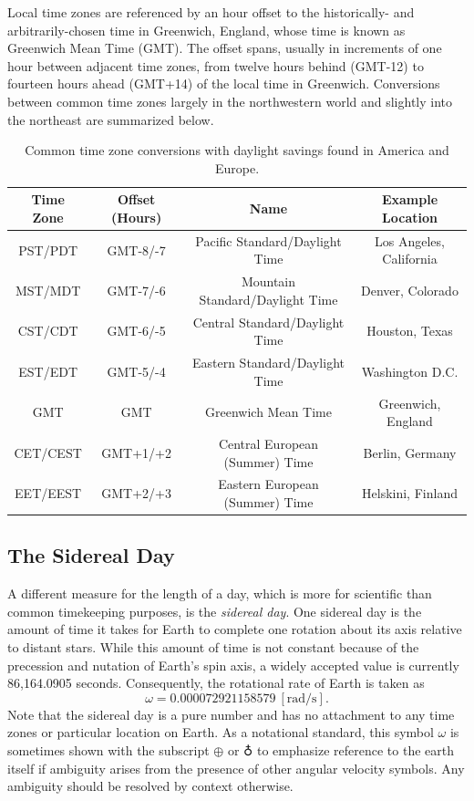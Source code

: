 \documentclass[11pt,dvipsnames]{thesis}
\begin{document}
Local time zones are referenced by an hour offset to the historically- and arbitrarily-chosen time in Greenwich, England, whose time is known as Greenwich Mean Time (GMT). The offset spans, usually in increments of one hour between adjacent time zones, from twelve hours behind (GMT-12) to fourteen hours ahead (GMT+14) of the local time in Greenwich. Conversions between common time zones largely in the northwestern world and slightly into the northeast are summarized below.
\begin{table}[H]
\centering
\caption{Common time zone conversions with daylight savings found in America and Europe.}
\label{tab:Timezones}
\begin{tabular}{SSSS}
\toprule
{Time Zone} & {Offset (Hours)} & {Name} & {Example Location} \\ \midrule
{PST/PDT} & {GMT-8/-7} & {Pacific Standard/Daylight Time} & {Los Angeles, California} \\
{MST/MDT} & {GMT-7/-6} & {Mountain Standard/Daylight Time} & {Denver, Colorado} \\
{CST/CDT} & {GMT-6/-5} & {Central Standard/Daylight Time} & {Houston, Texas} \\
{EST/EDT} & {GMT-5/-4} & {Eastern Standard/Daylight Time} & {Washington D.C.} \\
{GMT} & {GMT} & {Greenwich Mean Time} & {Greenwich, England} \\
{CET/CEST} & {GMT+1/+2} & {Central European (Summer) Time} & {Berlin, Germany} \\
{EET/EEST} & {GMT+2/+3} & {Eastern European (Summer) Time} & {Helskini, Finland} \\ \bottomrule
\end{tabular}
\end{table}

\subsection{The Sidereal Day}
A different measure for the length of a day, which is more for scientific than common timekeeping purposes, is the \textit{sidereal day}. One sidereal day is the amount of time it takes for Earth to complete one rotation about its axis relative to distant stars. While this amount of time is not constant because of the precession and nutation of Earth's spin axis, a widely accepted value is currently 86,164.0905 seconds. Consequently, the rotational rate of Earth is taken as
\begin{equation}
\omega = \num{0.000072921158579} \ [\si{\radian/\s}]. \label{eq:EarthRotRate}
\end{equation}
Note that the sidereal day is a pure number and has no attachment to any time zones or particular location on Earth. As a notational standard, this symbol $\omega$ is sometimes shown with the subscript $\oplus$ or $\earth$ to emphasize reference to the earth itself if ambiguity arises from the presence of other angular velocity symbols. Any ambiguity should be resolved by context otherwise.
\end{document}
